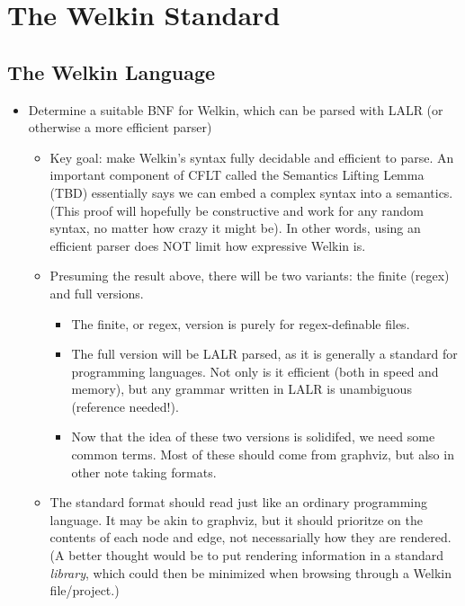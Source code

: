 
\chapter{The Welkin Standard}

\section{The Welkin Language}

\begin{itemize}
  \item Determine a suitable BNF for Welkin, which can be parsed with LALR (or otherwise a more efficient parser)
  \begin{itemize}
    \item Key goal: make Welkin's syntax fully decidable and efficient to parse. An important component of CFLT called the Semantics Lifting Lemma (TBD) essentially says we can embed a complex syntax into a semantics. (This proof will hopefully be constructive and work for any random syntax, no matter how crazy it might be). In other words, using an efficient parser does NOT limit how expressive Welkin is.
    \item Presuming the result above, there will be two variants: the finite (regex) and full versions.
          \begin{itemize}
            \item The finite, or regex, version is purely for regex-definable files.
            \item The full version will be LALR parsed, as it is generally a standard for programming languages. Not only is it efficient (both in speed and memory), but any grammar written in LALR is unambiguous (reference needed!).
\item Now that the idea of these two versions is solidifed, we need some common terms. Most of these should come from graphviz, but also in other note taking formats.
          \end{itemize}
    \item The standard format should read just like an ordinary programming language. It may be akin to graphviz, but it should prioritze on the contents of each node and edge, not necessarially how they are rendered. (A better thought would be to put rendering information in a standard \textit{library}, which could then be minimized when browsing through a Welkin file/project.)

\end{itemize}
\end{itemize}
